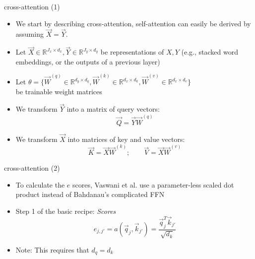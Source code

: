 
\begin{vbframe}{cross-attention (1)}

\vfill

\begin{itemize}
	\item We start by describing cross-attention, self-attention can easily be derived by assuming $\vec X = \vec Y$. 
	\item Let $\vec X \in \mathbb{R}^{J_x \times d_x}, \vec Y \in \mathbb{R}^{J_y \times d_y}$ be representations of $X, Y$ (e.g., stacked word embeddings, or the outputs of a previous layer)
	\item Let $\theta = \{\vec W^{(q)} \in \mathbb{R}^{d_y \times d_q}, \vec W^{(k)} \in \mathbb{R}^{d_x \times d_k}, \vec W^{(v)} \in \mathbb{R}^{d_x \times d_v}\}$\\ be trainable weight matrices
	\item We transform $\vec Y$ into a matrix of query vectors:
	$$ \vec Q = \vec Y \vec W^{(q)} $$
	\item We transform $\vec X$ into matrices of key and value vectors:
	$$ \vec K = \vec X \vec W^{(k)} ; \qquad \vec V =  \vec X \vec W^{(v)}$$
\end{itemize}

\vfill

\end{vbframe}


\begin{vbframe}{cross-attention (2)}

\vfill

\begin{itemize}
	\item To calculate the $e$ scores, Vaswani et al. use a parameter-less scaled dot product instead of Bahdanau's complicated FFN\medskip\medskip
	\item Step 1 of the basic recipe: \textit{Scores}
	$$ e_{j,j'} = a(\vec q_j, \vec k_{j'}) = \frac{\vec q_j^T \vec k_{j'}}{\sqrt{d_k}} $$
	\item Note: This requires that $d_q = d_k$
\end{itemize}

\vfill

\end{vbframe}


